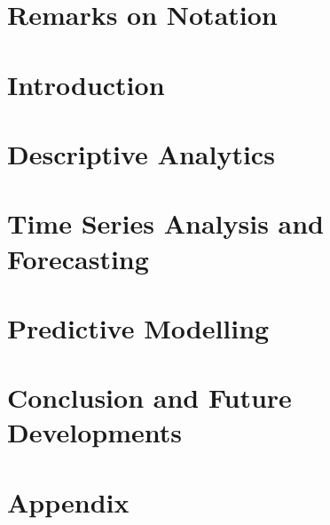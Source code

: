 \documentclass[12pt,a4paper]{report}
\date{September 2017}
\begin{document}


\setcounter{page}{1}

\chapter*{}


\chapter*{}


\tableofcontents
\listoftables
\listoffigures

\chapter*{Remarks on Notation}


\chapter{Introduction}
\label{Chapter 1}



\chapter{Descriptive Analytics}
\label{Chapter 2}



\chapter{Time Series Analysis and Forecasting}
\label{Chapter 3} 


\chapter{Predictive Modelling}
\label{Chapter 4}



\chapter{Conclusion and Future Developments}


\chapter{Appendix}


\begin{thebibliography}{99}

\end{thebibliography}
\end{document}
